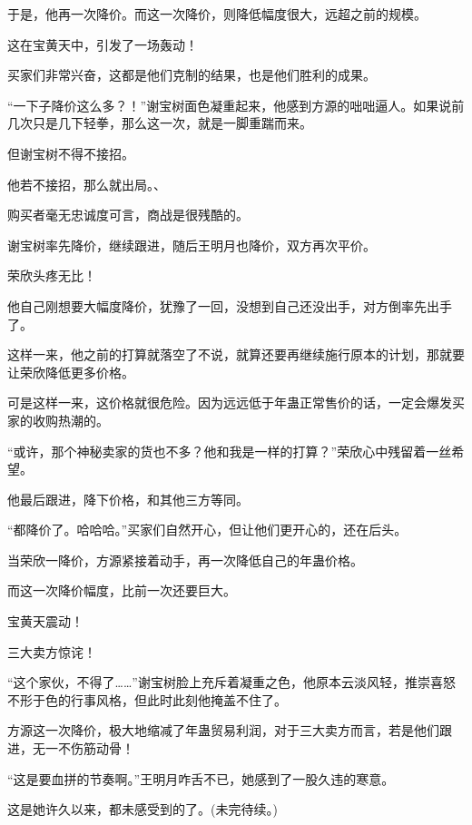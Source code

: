 \begin{this_body}
于是，他再一次降价。而这一次降价，则降低幅度很大，远超之前的规模。

这在宝黄天中，引发了一场轰动！

买家们非常兴奋，这都是他们克制的结果，也是他们胜利的成果。

“一下子降价这么多？！”谢宝树面色凝重起来，他感到方源的咄咄逼人。如果说前几次只是几下轻拳，那么这一次，就是一脚重踹而来。

但谢宝树不得不接招。

他若不接招，那么就出局。、

购买者毫无忠诚度可言，商战是很残酷的。

谢宝树率先降价，继续跟进，随后王明月也降价，双方再次平价。

荣欣头疼无比！

他自己刚想要大幅度降价，犹豫了一回，没想到自己还没出手，对方倒率先出手了。

这样一来，他之前的打算就落空了不说，就算还要再继续施行原本的计划，那就要让荣欣降低更多价格。

可是这样一来，这价格就很危险。因为远远低于年蛊正常售价的话，一定会爆发买家的收购热潮的。

“或许，那个神秘卖家的货也不多？他和我是一样的打算？”荣欣心中残留着一丝希望。

他最后跟进，降下价格，和其他三方等同。

“都降价了。哈哈哈。”买家们自然开心，但让他们更开心的，还在后头。

当荣欣一降价，方源紧接着动手，再一次降低自己的年蛊价格。

而这一次降价幅度，比前一次还要巨大。

宝黄天震动！

三大卖方惊诧！

“这个家伙，不得了……”谢宝树脸上充斥着凝重之色，他原本云淡风轻，推崇喜怒不形于色的行事风格，但此时此刻他掩盖不住了。

方源这一次降价，极大地缩减了年蛊贸易利润，对于三大卖方而言，若是他们跟进，无一不伤筋动骨！

“这是要血拼的节奏啊。”王明月咋舌不已，她感到了一股久违的寒意。

这是她许久以来，都未感受到的了。(未完待续。)

\end{this_body}

